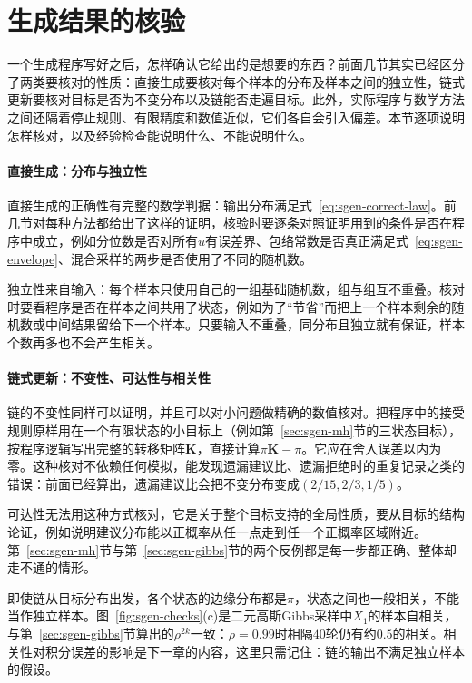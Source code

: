 \section{生成结果的核验}
\label{sec:sgen-checks}

一个生成程序写好之后，怎样确认它给出的是想要的东西？前面几节其实已经区分了两类要核对的性质：直接生成要核对每个样本的分布及样本之间的独立性，链式更新要核对目标是否为不变分布以及链能否走遍目标。此外，实际程序与数学方法之间还隔着停止规则、有限精度和数值近似，它们各自会引入偏差。本节逐项说明怎样核对，以及经验检查能说明什么、不能说明什么。

\paragraph{直接生成：分布与独立性}
直接生成的正确性有完整的数学判据：输出分布满足式~\eqref{eq:sgen-correct-law}。前几节对每种方法都给出了这样的证明，核验时要逐条对照证明用到的条件是否在程序中成立，例如分位数是否对所有$u$有误差界、包络常数是否真正满足式~\eqref{eq:sgen-envelope}、混合采样的两步是否使用了不同的随机数。

独立性来自输入：每个样本只使用自己的一组基础随机数，组与组互不重叠。核对时要看程序是否在样本之间共用了状态，例如为了“节省”而把上一个样本剩余的随机数或中间结果留给下一个样本。只要输入不重叠，同分布且独立就有保证，样本个数再多也不会产生相关。

\paragraph{链式更新：不变性、可达性与相关性}
链的不变性同样可以证明，并且可以对小问题做精确的数值核对。把程序中的接受规则原样用在一个有限状态的小目标上（例如第~\ref{sec:sgen-mh}节的三状态目标），按程序逻辑写出完整的转移矩阵$\bm{K}$，直接计算$\pi\bm{K}-\pi$。它应在舍入误差以内为零。这种核对不依赖任何模拟，能发现遗漏建议比、遗漏拒绝时的重复记录之类的错误：前面已经算出，遗漏建议比会把不变分布变成$(2/15,2/3,1/5)$。

可达性无法用这种方式核对，它是关于整个目标支持的全局性质，要从目标的结构论证，例如说明建议分布能以正概率从任一点走到任一个正概率区域附近。第~\ref{sec:sgen-mh}节与第~\ref{sec:sgen-gibbs}节的两个反例都是每一步都正确、整体却走不通的情形。

即使链从目标分布出发，各个状态的边缘分布都是$\pi$，状态之间也一般相关，不能当作独立样本。图~\ref{fig:sgen-checks}(c)是二元高斯Gibbs采样中$X_1$的样本自相关，与第~\ref{sec:sgen-gibbs}节算出的$\rho^{2k}$一致：$\rho=0.99$时相隔$40$轮仍有约$0.5$的相关。相关性对积分误差的影响是下一章的内容，这里只需记住：链的输出不满足独立样本的假设。

